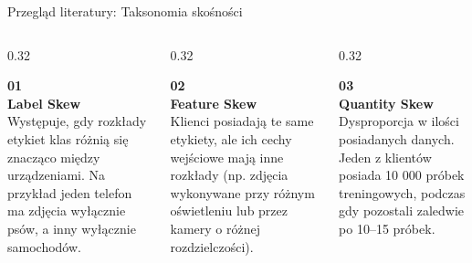 \documentclass[9pt,aspectratio=169]{beamer}
\begin{document}
\begin{frame}{Przegląd literatury: Taksonomia skośności}
\begin{columns}[T]
\begin{column}{0.32\textwidth}
\begin{cardpurple}
{\LARGE\bfseries\textcolor{primarypurple}{01}}\\[4pt]
\textbf{Label Skew}\\[4pt]
\footnotesize Występuje, gdy rozkłady etykiet klas różnią się znacząco między urządzeniami. Na przykład jeden telefon ma zdjęcia wyłącznie psów, a inny wyłącznie samochodów.
\end{cardpurple}
\end{column}
\begin{column}{0.32\textwidth}
\begin{cardgreen}
{\LARGE\bfseries\textcolor{accentgreen}{02}}\\[4pt]
\textbf{Feature Skew}\\[4pt]
\footnotesize Klienci posiadają te same etykiety, ale ich cechy wejściowe mają inne rozkłady (np. zdjęcia wykonywane przy różnym oświetleniu lub przez kamery o różnej rozdzielczości).
\end{cardgreen}
\end{column}
\begin{column}{0.32\textwidth}
\begin{cardorange}
{\LARGE\bfseries\textcolor{accentorange}{03}}\\[4pt]
\textbf{Quantity Skew}\\[4pt]
\footnotesize Dysproporcja w ilości posiadanych danych. Jeden z klientów posiada 10 000 próbek treningowych, podczas gdy pozostali zaledwie po 10--15 próbek.
\end{cardorange}
\end{column}
\end{columns}
\end{frame}
\end{document}
